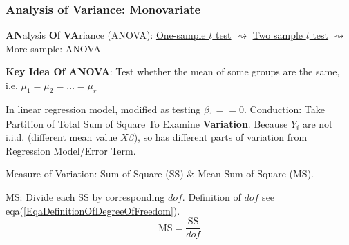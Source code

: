 \subsubsection{Analysis of Variance: Monovariate}
    \textbf{AN}alysis \textbf{O}f \textbf{VA}riance (ANOVA): \hyperlink{OneSampletTest}{One-sample $ t $ test} $\rightsquigarrow $ \hyperlink{TwoSampletTest}{Two sample $ t $ test} $\rightsquigarrow $ More-sample: ANOVA

\begin{point}
    \textbf{Key Idea Of ANOVA}: Test whether the mean of some groups are the same, i.e. $ \mu_1=\mu _2=\ldots=\mu _r $ 
\end{point}



    In linear regression model, modified as testing $ \beta _1==0 $. Conduction: Take Partition of Total Sum of Square To Examine \textbf{Variation}. Because $ Y_i $ are not i.i.d. (different mean value $ X\beta  $), so has different parts of variation from Regression Model/Error Term.




    Measure of Variation: Sum of Square (SS) \& Mean Sum of Square (MS).

    MS: Divide each SS by corresponding $ dof $. Definition of $ dof $ see eqa(\ref{EqaDefinitionOfDegreeOfFreedom}).
    \begin{equation}
        \mathrm{MS}=\dfrac{\mathrm{SS}}{dof} 
    \end{equation}


